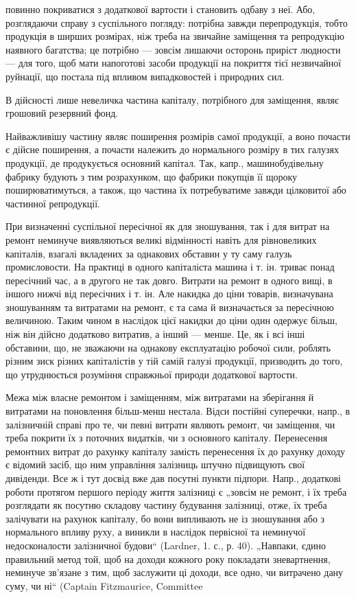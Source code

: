 \parcont{}  %
повинно покриватися з додаткової вартости і становить одбаву з неї. Або, розглядаючи справу з
суспільного погляду: потрібна завжди перепродукція, тобто продукція в ширших розмірах, ніж треба на
звичайне заміщення та репродукцію наявного багатства; це потрібно — зовсім лишаючи осторонь приріст
людности — для того, щоб мати напоготові засоби продукції на покриття тієї незвичайної руйнації, що
постала під впливом випадковостей і природних сил.

В дійсності лише невеличка частина капіталу, потрібного для заміщення, являє грошовий резервний
фонд.

Найважливішу частину являє поширення розмірів самої продукції, а воно почасти є дійсне поширення, а
почасти належить до нормального розміру в тих галузях продукції, де продукується основний капітал.
Так, капр., машинобудівельну фабрику будують з тим розрахунком, що фабрики покупців її щороку
поширюватимуться, а також, що частина їх потребуватиме завжди цілковитої або частинної репродукції.

При визначенні суспільної пересічної як для зношування, так і для витрат на ремонт неминуче
виявляються великі відмінності навіть для рівновеликих капіталів, взагалі вкладених за однакових
обставин у ту саму галузь промисловости. На практиці в одного капіталіста машина і т. ін. триває
понад пересічний час, а в другого не так довго. Витрати на ремонт в одного вищі, в іншого нижчі від
пересічних і т. ін. Але накидка до ціни товарів, визначувана зношуванням та витратами на ремонт, є
та сама й визначається за пересічною величиною. Таким чином в наслідок цієї накидки до ціни один
одержує більш, ніж він дійсно додатково витратив, а інший — менше. Це, як і всі інші обставини, що,
не зважаючи на однакову експлуатацію робочої сили, роблять різним зиск різних капіталістів у тій
самій галузі продукції, призводить до того, що утруднюється розуміння справжньої природи додаткової
вартости.

Межа між власне ремонтом і заміщенням, між витратами на зберігання й витратами на поновлення
більш-менш нестала. Відси постійні суперечки, напр., в залізничній справі про те, чи певні витрати
являють ремонт, чи заміщення, чи треба покрити їх з поточних видатків, чи з основного капіталу.
Перенесення ремонтних витрат до рахунку капіталу замість перенесення їх до рахунку доходу є відомий
засіб, що ним управління залізниць штучно підвищують свої дивіденди. Все ж і тут досвід вже дав
посутні пункти підпори. Напр., додаткові роботи протягом першого періоду життя залізниці є „зовсім
не ремонт, і їх треба розглядати як посутню складову частину будування залізниці, отже, їх треба
залічувати на рахунок капіталу, бо вони випливають не із зношування або з нормального впливу руху, а
виникли в наслідок первісної та неминучої недосконалости залізничної будови“ (Lardner, 1. с., р.
40). „Навпаки, єдино правильний метод той, щоб на доходи кожного року покладати зневартнення,
неминуче зв’язане з тим, щоб заслужити ці доходи, все одно, чи витрачено дану суму, чи ні“ (Captain
Fitzmaurice, Committee
\parbreak{}  %
